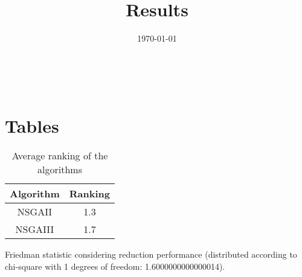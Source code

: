 \documentclass{article}
\title{Results}
\author{}
\date{\today}
\begin{document}
\oddsidemargin 0in \topmargin 0in\maketitle
\
\section{Tables}
\begin{table}[!htp]
\centering
\caption{Average ranking of the algorithms}
\begin{tabular}{c|c}
Algorithm&Ranking\\
\hline
NSGAII&1.3\\
NSGAIII&1.7\\
\end{tabular}
\end{table}


Friedman statistic considering reduction performance (distributed according to chi-square with 1 degrees of freedom: 1.6000000000000014).
\end{document}
